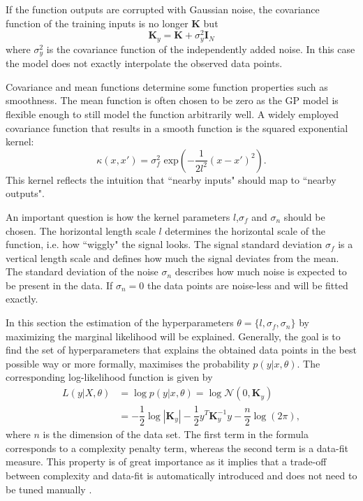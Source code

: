 \documentclass[../main.tex]{subfiles}
\begin{document}
If the function outputs are corrupted with Gaussian noise, the covariance function of the training inputs is no longer $\mathbf{K}$ but
\begin{equation}
    \mathbf{K}_y = \mathbf{K} + \sigma_y^2\mathbf{I}_N
\end{equation}
where $\sigma_y^2$ is the covariance function of the independently added noise. In this case the model does not exactly interpolate the observed data points.\par
Covariance and mean functions determine some function properties such as smoothness. The mean function is often chosen to be zero as the GP model is flexible enough to still model the function arbitrarily well. A widely employed covariance function that results in a smooth function is the squared exponential kernel:
\begin{equation}\label{eq:sqexp}
    \kappa(x,x') = \sigma^2_f \text{ exp}\left(-\dfrac{1}{2l^2}(x-x')^2\right).
\end{equation}
This kernel reflects the intuition that ``nearby inputs" should map to ``nearby outputs". \par 
An important question is how the kernel parameters $l$,$\sigma_f$ and $\sigma_n$ should be chosen. The horizontal length scale $l$ determines the horizontal scale of the function, i.e. how ``wiggly" the signal looks. The signal standard deviation $\sigma_f$ is a vertical length scale and defines how much the signal deviates from the mean. The standard deviation of the noise $\sigma_n$ describes how much noise is expected to be present in the data. If $\sigma_n = 0$ the data points are noise-less and will be fitted exactly. \par
In this section the estimation of the hyperparameters $\theta = \{l,\sigma_f, \sigma_n\}$ by maximizing the marginal likelihood will be explained. Generally, the goal is to find the set of hyperparameters that explains the obtained data points in the best possible way or more formally, maximises the probability $p(y|x,\theta)$. The corresponding log-likelihood function is given by
\begin{align}
    L(y|X, \theta) &= \log p(y|x,\theta) = \log \mathcal{N}(0,\mathbf{K}_y)\\
    &= -\dfrac{1}{2} \log|\mathbf{K}_y|-\dfrac{1}{2}y^T\mathbf{K}_y^{-1}y-\dfrac{n}{2}\log(2\pi),
\end{align}
where $n$ is the dimension of the data set. The first term in the formula corresponds to a complexity penalty term, whereas the second term is a data-fit measure. This property is of great importance as it implies that a trade-off between complexity and data-fit is automatically introduced and does not need to be tuned manually \cite{rasmussen2006gaussian}. 
\end{document}
